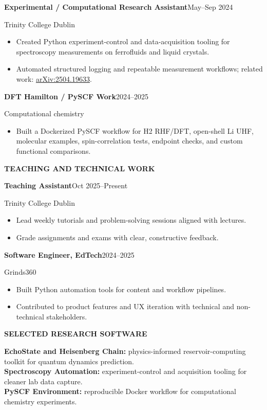 \documentclass[10pt,a4paper]{article}
\newcommand{\sectiontitle}[1]{%
  \vspace{9pt}
  {\small\bfseries\color{accent}\MakeUppercase{#1}}\par
  \vspace{2.7pt}{\color{rule}\hrule height 0.55pt}\vspace{5.2pt}
}
\newcommand{\role}[3]{%
  {\bfseries #1}\hfill{\small\color{muted}#2}\par
  {\small\color{muted}#3}\par
}
\newcommand{\tightrole}[3]{%
  {\bfseries #1}\hfill{\small\color{muted}#2}\par
  {\small\color{muted}#3}\par\vspace{2pt}
}
\begin{document}
\begin{minipage}[t][0.835\textheight][t]{0.645\linewidth}
\role{Experimental / Computational Research Assistant}{May--Sep 2024}{Trinity College Dublin}
\begin{itemize}
  \item Created Python experiment-control and data-acquisition tooling for spectroscopy measurements on ferrofluids and liquid crystals.
  \item Automated structured logging and repeatable measurement workflows; related work: \href{https://arxiv.org/abs/2504.19633}{arXiv:2504.19633}.
\end{itemize}
\vspace{2pt}

\role{DFT Hamilton / PySCF Work}{2024--2025}{Computational chemistry}
\begin{itemize}
  \item Built a Dockerized PySCF workflow for H2 RHF/DFT, open-shell Li UHF, molecular examples, spin-correlation tests, endpoint checks, and custom functional comparisons.
\end{itemize}

\sectiontitle{Teaching And Technical Work}

\tightrole{Teaching Assistant}{Oct 2025--Present}{Trinity College Dublin}
\begin{itemize}
  \item Lead weekly tutorials and problem-solving sessions aligned with lectures.
  \item Grade assignments and exams with clear, constructive feedback.
\end{itemize}
\vspace{2pt}

\tightrole{Software Engineer, EdTech}{2024--2025}{Grinds360}
\begin{itemize}
  \item Built Python automation tools for content and workflow pipelines.
  \item Contributed to product features and UX iteration with technical and non-technical stakeholders.
\end{itemize}

\vfill
\sectiontitle{Selected Research Software}
{\small
\textbf{EchoState and Heisenberg Chain:} physics-informed reservoir-computing toolkit for quantum dynamics prediction.\\[2pt]
\textbf{Spectroscopy Automation:} experiment-control and acquisition tooling for cleaner lab data capture.\\[2pt]
\textbf{PySCF Environment:} reproducible Docker workflow for computational chemistry experiments.
}

\end{minipage}
\end{document}
